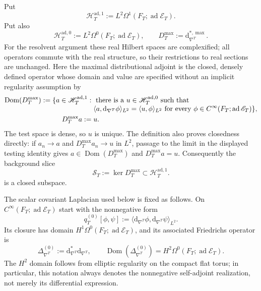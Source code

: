 Put
\[
 \mathscr H_T^{\mathrm{ad},1}
 :=L^2\Omega^1(F_T;\operatorname{ad}\mathscr E_T).
\]
Put also
\[
 \mathscr H_T^{\mathrm{ad},0}
 :=L^2\Omega^0(F_T;\operatorname{ad}\mathscr E_T),
 \qquad
 D_T^{\max}:=\mathrm d_{\nabla^T}^{*,\max}.
\]
For the resolvent argument these real Hilbert spaces are complexified;
all operators commute with the real structure, so their restrictions to
real sections are unchanged.
Here the maximal distributional adjoint is the closed, densely defined
operator whose domain and value are specified without an implicit
regularity assumption by
\begin{align}
 \operatorname{Dom}(D_T^{\max})
 :=\{a\in\mathscr H_T^{\mathrm{ad},1}:{}&\text{ there is a }u\in
 \mathscr H_T^{\mathrm{ad},0}\text{ such that}\notag\\[-1mm]
 &\langle a,\mathrm d_{\nabla^T}\phi\rangle_{L^2}
 =\langle u,\phi\rangle_{L^2}
 \text{ for every }\phi\in
 C^\infty(F_T;\operatorname{ad}\mathscr E_T)\},
 \label{cusp-magnetic-maximal-codifferential-domain}\\
 D_T^{\max}a:={}&u.\notag
\end{align}
The test space is dense, so \(u\) is unique.  The definition also proves
closedness directly: if \(a_n\to a\) and \(D_T^{\max}a_n\to u\) in
\(L^2\), passage to the limit in the displayed testing identity gives
\(a\in\operatorname{Dom}(D_T^{\max})\) and \(D_T^{\max}a=u\).
Consequently the background slice
\begin{equation}
 \mathscr S_T
 :=\ker D_T^{\max}
 \subset\mathscr H_T^{\mathrm{ad},1}.
 \label{cusp-magnetic-closed-background-slice}
\end{equation}
is a closed subspace.

The scalar covariant Laplacian used below is fixed as follows.  On
\(C^\infty(F_T;\operatorname{ad}\mathscr E_T)\) start with the
nonnegative form
\[
 q_T^{(0)}[\phi,\psi]
 :=\langle\mathrm d_{\nabla^T}\phi,
             \mathrm d_{\nabla^T}\psi\rangle_{L^2}.
\]
Its closure has domain
\(H^1\Omega^0(F_T;\operatorname{ad}\mathscr E_T)\), and its associated
Friedrichs operator is
\begin{equation}
 \Delta_{\nabla^T}^{(0)}
 :=\mathrm d_{\nabla^T}^*\mathrm d_{\nabla^T},
 \qquad
 \operatorname{Dom}(\Delta_{\nabla^T}^{(0)})
 =H^2\Omega^0(F_T;\operatorname{ad}\mathscr E_T).
 \label{cusp-magnetic-scalar-covariant-laplacian-domain}
\end{equation}
The \(H^2\) domain follows from elliptic regularity on the compact flat
torus; in particular, this notation always denotes the nonnegative
self-adjoint realization, not merely its differential expression.

